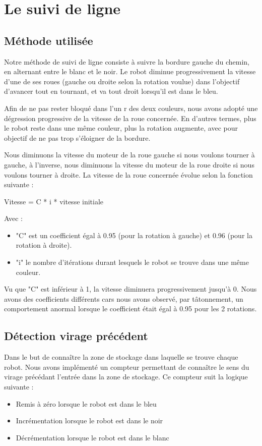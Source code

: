 \documentclass[french,a4paper,12pt]{report}
\begin{document}
\chapter{Le suivi de ligne} %

\section{Méthode utilisée}
Notre méthode de suivi de ligne consiste à suivre la bordure gauche du chemin, en alternant entre le blanc et le noir. Le robot diminue progressivement la vitesse d’une de ses roues (gauche ou droite selon la rotation voulue) dans l’objectif d’avancer tout en tournant, et va tout droit lorsqu’il est dans le bleu.

Afin de ne pas rester bloqué dans l'un r des deux couleurs, nous avons adopté une dégression progressive de la vitesse de la roue concernée. En d'autres termes, plus le robot reste dans une même couleur, plus la rotation augmente, avec pour objectif de ne pas trop s'éloigner de la bordure.

Nous diminuons la vitesse du moteur de la roue gauche si nous voulons tourner à gauche, à l’inverse, nous diminuons la vitesse du moteur de la roue droite si nous voulons tourner à droite. La vitesse de la roue concernée évolue selon la fonction suivante :

Vitesse = C * i * vitesse initiale

Avec :
\begin{itemize}
\item "C" est un coefficient égal à 0.95 (pour la rotation à gauche) et 0.96 (pour la rotation à droite).

\item "i" le nombre d’itérations durant lesquels le robot se trouve dans une même couleur.
\end{itemize}

Vu que "C" est inférieur à 1, la vitesse diminuera progressivement jusqu’à 0.
Nous avons des coefficients différents cars nous avons observé, par tâtonnement, un comportement anormal lorsque le coefficient était égal à 0.95 pour les 2 rotations.

\section{Détection virage précédent}
Dans le but de connaître la zone de stockage dans laquelle se trouve chaque robot. Nous avons implémenté un compteur permettant de connaître le sens du virage précédant l’entrée dans la zone de stockage.
Ce compteur suit la logique suivante :
\begin{itemize}
\item Remis à zéro lorsque le robot est dans le bleu

\item Incrémentation lorsque le robot est dans le noir

\item Décrémentation lorsque le robot est dans le blanc
\end{itemize}
\end{document}
